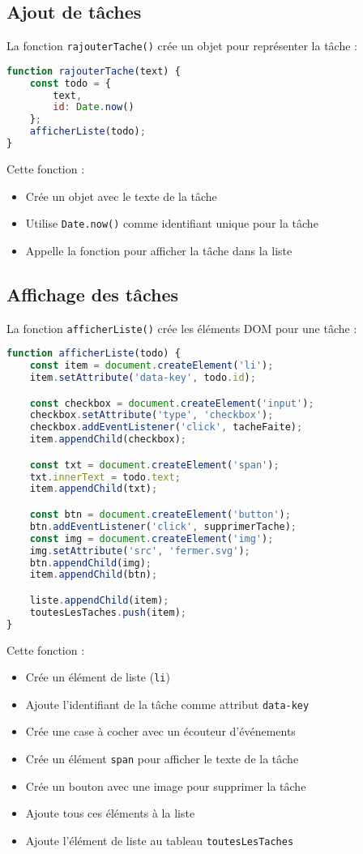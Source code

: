 \documentclass{article}
\begin{document}
\subsection{Ajout de tâches}
La fonction \texttt{rajouterTache()} crée un objet pour représenter la tâche :

\begin{lstlisting}[language=JavaScript]
function rajouterTache(text) {
    const todo = {
        text,
        id: Date.now()
    };
    afficherListe(todo);
}
\end{lstlisting}

Cette fonction :
\begin{itemize}
    \item Crée un objet avec le texte de la tâche
    \item Utilise \texttt{Date.now()} comme identifiant unique pour la tâche
    \item Appelle la fonction pour afficher la tâche dans la liste
\end{itemize}

\subsection{Affichage des tâches}
La fonction \texttt{afficherListe()} crée les éléments DOM pour une tâche :

\begin{lstlisting}[language=JavaScript]
function afficherListe(todo) {
    const item = document.createElement('li');
    item.setAttribute('data-key', todo.id);

    const checkbox = document.createElement('input');
    checkbox.setAttribute('type', 'checkbox');
    checkbox.addEventListener('click', tacheFaite);
    item.appendChild(checkbox);

    const txt = document.createElement('span');
    txt.innerText = todo.text;
    item.appendChild(txt);

    const btn = document.createElement('button');
    btn.addEventListener('click', supprimerTache);
    const img = document.createElement('img');
    img.setAttribute('src', 'fermer.svg');
    btn.appendChild(img);
    item.appendChild(btn);

    liste.appendChild(item);
    toutesLesTaches.push(item);
}
\end{lstlisting}

Cette fonction :
\begin{itemize}
    \item Crée un élément de liste (\texttt{li})
    \item Ajoute l'identifiant de la tâche comme attribut \texttt{data-key}
    \item Crée une case à cocher avec un écouteur d'événements
    \item Crée un élément \texttt{span} pour afficher le texte de la tâche
    \item Crée un bouton avec une image pour supprimer la tâche
    \item Ajoute tous ces éléments à la liste
    \item Ajoute l'élément de liste au tableau \texttt{toutesLesTaches}
\end{itemize}
\end{document}
